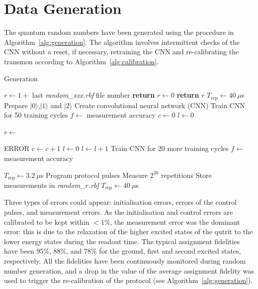\documentclass[l1pt]{elsarticle}
\begin{document}
{\color{black}
\section{Data Generation}\label{data}
The quantum random numbers have been generated using the procedure in Algorithm~\ref{alg:generation}. The algorithm involves intermittent checks of the CNN without a reset, if necessary, retraining the CNN and re-calibrating the transmon according to Algorithm~\ref{alg:calibration}. %



\begin{algorithm}
\caption{Generation}\label{alg:generation}
\begin{algorithmic}[1]
        \State $r \gets 1+$ last \textit{random\_xxx.rbf} file number
    \Else
        \State \textbf{return} $r \gets 0$
    \EndIf
    \State \textbf{return} $r$
\EndProcedure
\State $T_{\text{rep}} \gets 40~\mu$s
\State Prepare $|0\rangle$,$|1\rangle$ and $|2\rangle$ 
\State Create convolutional neural network (CNN)
\State Train CNN for 50 training cycles
\State $f \gets $ measurement accuracy 
\State $c \gets 0$ 
\State $l \gets 0$ 

\State $r \gets $

                \State ERROR
            \EndIf
            \State {}
            \State $c \gets c+1$
            \State $l \gets 0$
        \EndIf
        \State $l \gets l+1$
        \State Train CNN for 20 more training cycles
        \State $f \gets $ measurement accuracy
    \EndWhile

    \State $T_{\text{rep}} \gets 3.2~\mu$s
    \State Program protocol pulses
    \State Measure $2^{26}$ repetitions
    \State Store measurements in \textit{random\_$r$.rbf}
    \State $T_{\text{rep}} \gets 40~\mu$s
\EndWhile
\end{algorithmic}
\end{algorithm}

Three types of errors could appear: initialisation errors, errors of the control pulses, and measurement errors. As the initialisation and control errors are calibrated to be kept within $<1\%$, the measurement error was the dominant error: this is due to the relaxation of the higher excited states of the qutrit to the lower energy states during the readout time. The typical assignment fidelities have been $95\%$, $88\%$, and  $78\%$ for the ground, first and second excited states, respectively.  All the fidelities have been continuously monitored during random number generation, and a drop in the value of the average assignment fidelity was used to trigger the re-calibration of the protocol (see Algorithm~\ref{alg:generation}). %

}
\end{document}
